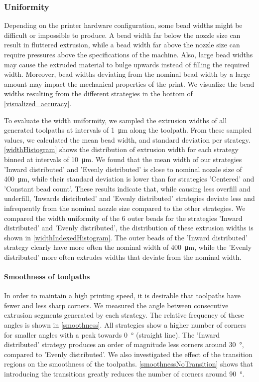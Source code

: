








\subsubsection{Uniformity}
Depending on the printer hardware configuration, some bead widths might be difficult or impossible to produce.
A bead width far below the nozzle size can result in fluttered extrusion, while a bead width far above the nozzle size can require pressures above the specifications of the machine. 
Also, large bead widths may cause the extruded material to bulge upwards instead of filling the required width.
Moreover, bead widths deviating from the nominal bead width by a large amount may impact the mechanical properties of the print.
We visualize the bead widths resulting from the different strategies in the bottom of \cref{visualized_accuracy}.

To evaluate the width uniformity, we sampled the extrusion widths of all generated toolpaths 
at intervals of \SI{1}{\micro\meter} along the toolpath.
From these sampled values, we calculated the mean bead width, and standard deviation per strategy.
\cref{widthHistogram} shows the distribution of extrusion width for each strategy binned at intervals of \SI{10}{\micro\meter}.
We found that the mean width of our strategies 'Inward distributed' and 'Evenly distributed' is close to nominal nozzle size of \SI{400}{\micro\meter}, while their standard deviation is lower than for strategies 'Centered' and 'Constant bead count'. 
These results indicate that, while causing less overfill and underfill, 'Inwards distributed' and 'Evenly distributed' strategies deviate less and infrequently from the nominal nozzle size compared to the other strategies.
We compared the width uniformity of the 6 outer beads for the strategies 'Inward distributed' and 'Evenly distributed', the distribution of these extrusion widths is shown in \cref{widthIndexedHistogram}. 
The outer beads of the 'Inward distributed' strategy clearly have more often the nominal width of \SI{400}{\micro\meter}, while the 'Evenly distributed' more often extrudes widths that deviate from the nominal width.

\paragraph{Smoothness of toolpaths}
In order to maintain a high printing speed, it is desirable that toolpaths have fewer and less sharp corners. 
We measured the angle between consecutive extrusion segments generated by each strategy.
The relative frequency of these angles is shown in \cref{smoothness}.
All strategies show a higher number of corners for smaller angles with a peak towards \SI{0}{\degree} (straight line).
The 'Inward distributed' strategy produces an order of magnitude less corners around \SI{30}{\degree}, compared to 'Evenly distributed'. 
We also investigated the effect of the transition regions on the smoothness of the toolpaths. 
\cref{smoothnessNoTransition} shows that introducing the transitions greatly reduces the number of corners around \SI{90}{\degree}. 

